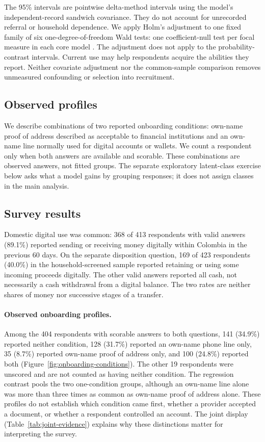 The 95\% intervals are pointwise delta-method intervals using the model's independent-record sandwich covariance. They do not account for unrecorded referral or household dependence. We apply Holm's adjustment to one fixed family of six one-degree-of-freedom Wald tests: one coefficient-null test per focal measure in each core model \citep{holm1979}. The adjustment does not apply to the probability-contrast intervals. Current use may help respondents acquire the abilities they report. Neither covariate adjustment nor the common-sample comparison removes unmeasured confounding or selection into recruitment.

\subsection{Observed profiles}
We describe combinations of two reported onboarding conditions: own-name proof of address described as acceptable to financial institutions and an own-name line normally used for digital accounts or wallets. We count a respondent only when both answers are available and scorable. These combinations are observed answers, not fitted groups. The separate exploratory latent-class exercise below asks what a model gains by grouping responses; it does not assign classes in the main analysis.

\subsection{Survey results}
\label{sec:survey-results}
Domestic digital use was common: 368 of 413 respondents with valid answers (89.1\%) reported sending or receiving money digitally within Colombia in the previous 60 days. On the separate disposition question, 169 of 423 respondents (40.0\%) in the household-screened sample reported retaining or using some incoming proceeds digitally. The other valid answers reported all cash, not necessarily a cash withdrawal from a digital balance. The two rates are neither shares of money nor successive stages of a transfer.

\paragraph{Observed onboarding profiles.} Among the 404 respondents with scorable answers to both questions, 141 (34.9\%) reported neither condition, 128 (31.7\%) reported an own-name phone line only, 35 (8.7\%) reported own-name proof of address only, and 100 (24.8\%) reported both (Figure~\ref{fig:onboarding-conditions}). The other 19 respondents were unscored and are not counted as having neither condition. The regression contrast pools the two one-condition groups, although an own-name line alone was more than three times as common as own-name proof of address alone. These profiles do not establish which condition came first, whether a provider accepted a document, or whether a respondent controlled an account. The joint display (Table~\ref{tab:joint-evidence}) explains why these distinctions matter for interpreting the survey.

